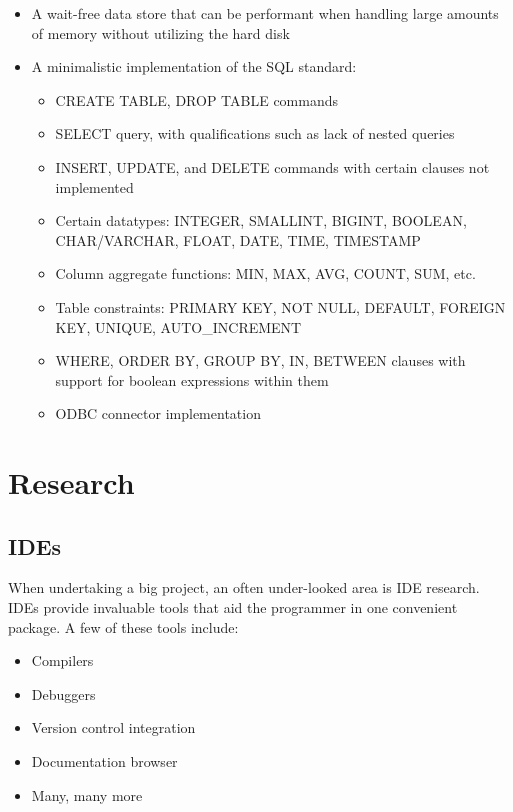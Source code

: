 \documentclass[letterpaper, 12pt]{article}
\begin{document}
\begin{itemize}
 \item A wait-free data store that can be performant when handling large amounts
 of memory without utilizing the hard disk
 \item A minimalistic implementation of the SQL standard:
 \begin{itemize}
  \item CREATE TABLE, DROP TABLE commands
  \item SELECT query, with qualifications such as lack of nested queries
  \item INSERT, UPDATE, and DELETE commands with certain clauses not implemented
  \item Certain datatypes: INTEGER, SMALLINT, BIGINT, BOOLEAN, CHAR/VARCHAR, FLOAT, DATE, TIME, TIMESTAMP
  \item Column aggregate functions: MIN, MAX, AVG, COUNT, SUM, etc.
  \item Table constraints: PRIMARY KEY, NOT NULL, DEFAULT, FOREIGN KEY, UNIQUE, AUTO\_INCREMENT
  \item WHERE, ORDER BY, GROUP BY, IN, BETWEEN clauses with support for boolean expressions within them
  \item ODBC connector implementation
 \end{itemize}
\end{itemize}

\newpage

\section{Research}

\subsection{IDEs}
When undertaking a big project, an often under-looked area is IDE research. IDEs provide invaluable tools that aid the programmer in one convenient package. A few of these tools include:

\begin{itemize}
	\item Compilers
	\item Debuggers
	\item Version control integration
	\item Documentation browser
	\item Many, many more
\end{itemize}
\end{document}

